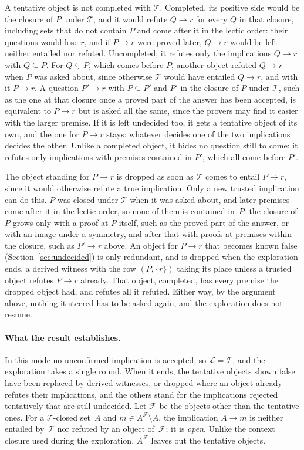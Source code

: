 \documentclass[11pt,a4paper]{article}
\theoremstyle{definition}
\theoremstyle{remark}
\newcommand{\cl}{\mathcal{L}}
\begin{document}
A tentative object is not completed with $\mathcal{T}$. Completed, its positive side would be the closure of $P$ under $\mathcal{T}$, and it would refute $Q \to r$ for every $Q$ in that closure, including sets that do not contain $P$ and come after it in the lectic order: their questions would lose $r$, and if $P \to r$ were proved later, $Q \to r$ would be left neither entailed nor refuted. Uncompleted, it refutes only the implications $Q \to r$ with $Q \subseteq P$. For $Q \subsetneq P$, which comes before $P$, another object refuted $Q \to r$ when $P$ was asked about, since otherwise $\mathcal{T}$ would have entailed $Q \to r$, and with it $P \to r$. A question $P' \to r$ with $P \subseteq P'$ and $P'$ in the closure of $P$ under $\mathcal{T}$, such as the one at that closure once a proved part of the answer has been accepted, is equivalent to $P \to r$ but is asked all the same, since the provers may find it easier with the larger premise. If it is left undecided too, it gets a tentative object of its own, and the one for $P \to r$ stays: whatever decides one of the two implications decides the other. Unlike a completed object, it hides no question still to come: it refutes only implications with premises contained in $P'$, which all come before $P'$.

The object standing for $P \to r$ is dropped as soon as $\mathcal{T}$ comes to entail $P \to r$, since it would otherwise refute a true implication. Only a new trusted implication can do this. $P$ was closed under $\mathcal{T}$ when it was asked about, and later premises come after it in the lectic order, so none of them is contained in~$P$: the closure of $P$ grows only with a proof at $P$ itself, such as the proved part of the answer, or with an image under a symmetry, and after that with proofs at premises within the closure, such as $P' \to r$ above. An object for $P \to r$ that becomes known false (Section~\ref{sec:undecided}) is only redundant, and is dropped when the exploration ends, a derived witness with the row $(P, \{r\})$ taking its place unless a trusted object refutes $P \to r$ already. That object, completed, has every premise the dropped object had, and refutes all it refuted. Either way, by the argument above, nothing it steered has to be asked again, and the exploration does not resume.

\paragraph{What the result establishes.}
In this mode no unconfirmed implication is accepted, so $\cl = \mathcal{T}$, and the exploration takes a single round. When it ends, the tentative objects shown false have been replaced by derived witnesses, or dropped where an object already refutes their implications, and the others stand for the implications rejected tentatively that are still undecided. Let $\mathcal{F}$ be the objects other than the tentative ones. For a $\mathcal{T}$-closed set~$A$ and $m \in A^{\mathcal{F}} \setminus A$, the implication $A \to m$ is neither entailed by~$\mathcal{T}$ nor refuted by an object of~$\mathcal{F}$; it is \emph{open}. Unlike the context closure used during the exploration, $A^{\mathcal{F}}$ leaves out the tentative objects.
\end{document}
